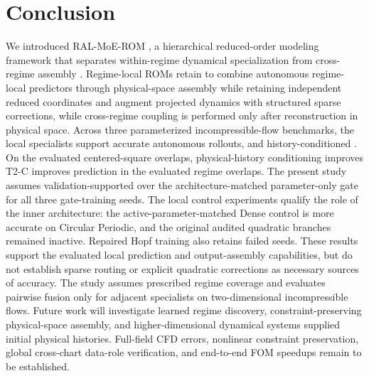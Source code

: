 \documentclass{article}
\providecommand{\DIFaddtex}[1]{{\protect\color{blue} \sf #1}} %
\providecommand{\DIFdeltex}[1]{{\protect\color{red} \scriptsize #1}} %
\providecommand{\DIFaddbegin}{} %
\providecommand{\DIFaddend}{} %
\providecommand{\DIFdelbegin}{} %
\providecommand{\DIFdelend}{} %
\providecommand{\DIFadd}[1]{\texorpdfstring{\DIFaddtex{#1}}{#1}} %
\providecommand{\DIFdel}[1]{\texorpdfstring{\DIFdeltex{#1}}{}} %
\begin{document}
\DIFaddend \FloatBarrier
\section{Conclusion}
\DIFdelbegin %

\DIFdelend We introduced RAL-MoE-ROM \DIFdelbegin \DIFdel{, a hierarchical reduced-order modeling framework that separates within-regime dynamical specialization from cross-regime assembly . Regime-local ROMs retain }\DIFdelend \DIFaddbegin \DIFadd{to combine autonomous regime-local predictors
through physical-space assembly while retaining }\DIFaddend independent reduced
coordinates\DIFdelbegin \DIFdel{and augment projected dynamics with structured sparse corrections, while
cross-regime coupling is performed only after reconstruction in physical space. Across three parameterized incompressible-flow benchmarks, the local specialists support accurate autonomous rollouts, and history-conditioned }\DIFdelend \DIFaddbegin \DIFadd{. On the evaluated centered-square overlaps, physical-history
conditioning improves }\DIFaddend T2-C \DIFdelbegin \DIFdel{improves prediction in the evaluated regime overlaps. The present study assumes validation-supported }\DIFdelend \DIFaddbegin \DIFadd{over the architecture-matched parameter-only
gate for all three gate-training seeds. The local control experiments
qualify the role of the inner architecture: the active-parameter-matched
Dense control is more accurate on Circular Periodic, and the original
audited quadratic branches remained inactive. Repaired Hopf training
also retains failed seeds. These results support the evaluated local
prediction and output-assembly capabilities, but do not establish sparse
routing or explicit quadratic corrections as necessary sources of
accuracy. The study assumes prescribed }\DIFaddend regime coverage and \DIFdelbegin \DIFdel{evaluates pairwise fusion only for adjacent specialists on two-dimensional incompressible flows. Future work will investigate learned regime discovery, constraint-preserving physical-space assembly, and higher-dimensional dynamical systems}\DIFdelend \DIFaddbegin \DIFadd{supplied
initial physical histories. Full-field CFD errors, nonlinear
constraint preservation, global cross-chart data-role verification,
and end-to-end FOM speedups remain to be established}\DIFaddend .
\end{document}
